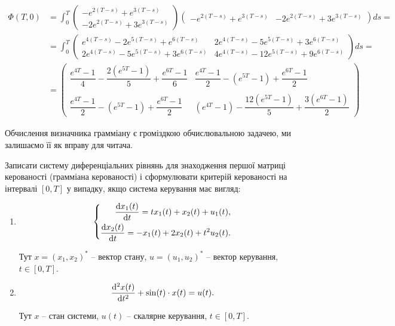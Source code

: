 \begin{solution}
    \begin{align*} 
        \Phi(T, 0) &= \int_0^T \begin{pmatrix} -e^{2(T - s)} + e^{3(T - s)} \\ -2e^{2(T - s)} + 3e^{3(T - s)} \end{pmatrix} \begin{pmatrix} -e^{2(T - s)} + e^{3(T - s)} & -2e^{2(T - s)} + 3e^{3(T - s)} \end{pmatrix} ds = \\
        &= \int_0^T \begin{pmatrix} e^{4(T - s)} - 2 e^{5(T - s)} + e^{6(T - s)} & 2 e^{4(T - s)} - 5 e^{5(T - s)} + 3 e^{6(T - s)} \\ 2e^{4(T - s)} - 5 e^{5(T - s)} + 3 e^{6(T - s)} & 4 e^{4(T - s)} - 12 e^{5(T - s)} + 9  e^{6(T - s)} \end{pmatrix} ds = \\
        &= \begin{pmatrix} \dfrac{e^{4T} - 1}{4} - \dfrac{2(e^{5T} - 1)}{5} + \dfrac{e^{6T} - 1}{6} & \dfrac{e^{4T} - 1}{2} - (e^{5T} - 1) + \dfrac{e^{6T} - 1}{2} \\ \\ \dfrac{e^{4T} - 1}{2} - (e^{5T} - 1) + \dfrac{e^{6T} - 1}{2} & (e^{4T} - 1) - \dfrac{12(e^{5T} - 1)}{5} + \dfrac{3(e^{6T} - 1)}{2} \end{pmatrix}
    \end{align*}
    
    Обчислення визначника грамміану є громіздкою обчислювальною задачею, ми залишаємо її як вправу для читача.
\end{solution}

\begin{problem}
	Записати систему диференціальних рівнянь для знаходження першої матриці керованості (грамміана керованості) і сформулювати критерій керованості на інтервалі $[0, T]$ у випадку, якщо система керування має вигляд:
	\begin{enumerate}
		\item \[ 
		\left\{
			\begin{aligned}
				\frac{\mathop{}\!\mathrm{d} x_1(t)}{\mathop{}\!\mathrm{d} t} = t x_1 (t) + x_2 (t) + u_1 (t), \\
				\frac{\mathop{}\!\mathrm{d} x_2(t)}{\mathop{}\!\mathrm{d} t} = - x_1 (t) + 2 x_2 (t) + t^2 u_2 (t).
			\end{aligned}
		\right.
		\]

		Тут $x = (x_1, x_2)^*$ -- вектор стану, $u = (u_1, u_2)^*$ -- вектор керування, $t \in [0, T]$.

		\item \[ \frac{\mathop{}\!\mathrm{d}^2 x(t)}{\mathop{}\!\mathrm{d} t^2} + \sin(t) \cdot x(t) = u(t). \]

		Тут $x$ -- стан системи, $u(t)$ -- скалярне керування, $t \in [0, T]$.
	\end{enumerate}
\end{problem}

